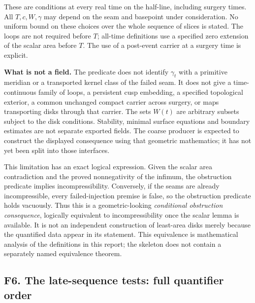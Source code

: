 \documentclass[
  letterpaper,
  11pt]{article}
\begin{document}
These are conditions at every real time on the half-line, including
surgery times. All \(T,c,W,\gamma\) may depend on the seam and basepoint
under consideration. No uniform bound on these choices over the whole
sequence of slices is stated. The loops are not required before \(T\);
all-time definitions use a specified zero extension of the scalar area
before \(T\). The use of a post-event carrier at a surgery time is
explicit.

\textbf{What is not a field.} The predicate does not identify
\(\gamma_t\) with a primitive meridian or a transported kernel class of
the failed seam. It does not give a time-continuous family of loops, a
persistent cusp embedding, a specified topological exterior, a common
unchanged compact carrier across surgery, or maps transporting disks
through that carrier. The sets \(W(t)\) are arbitrary subsets subject to
the disk conditions. Stability, minimal surface equations and boundary
estimates are not separate exported fields. The coarse producer is
expected to construct the displayed consequence using that geometric
mathematics; it has not yet been split into those interfaces.

This limitation has an exact logical expression. Given the scalar area
contradiction and the proved nonnegativity of the infimum, the
obstruction predicate implies incompressibility. Conversely, if the
seams are already incompressible, every failed-injection premise is
false, so the obstruction predicate holds vacuously. Thus this is a
geometric-looking \emph{conditional obstruction consequence}, logically
equivalent to incompressibility once the scalar lemma is available. It
is not an independent construction of least-area disks merely because
the quantified data appear in its statement. This equivalence is
mathematical analysis of the definitions in this report; the skeleton
does not contain a separately named equivalence theorem.

\subsection{F6. The late-sequence tests: full quantifier
order}\label{f6-sequence-tests}
\end{document}
